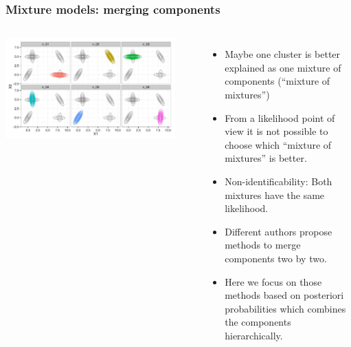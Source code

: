 \begin{frame}
\frametitle{Mixture models: merging components}

\begin{columns}[T]
\centering
\includegraphics[width=0.9\textwidth]{static_figures/baudry_ex4_1_all_distributions.pdf}

\bigskip
{}

\small
\begin{itemize}
\item Maybe one cluster is better explained as one mixture of components (``mixture of mixtures'')
\item<2-> From a likelihood point of view it is not possible to choose which ``mixture of mixtures'' is better.
\item<3-> Non-identificability: Both mixtures have the same likelihood.
\item<4> Different authors propose methods to merge components two by two.
\item<4> Here we focus on those methods based on posteriori probabilities which combines the components hierarchically.
\end{itemize}
\end{columns}
\end{frame}


